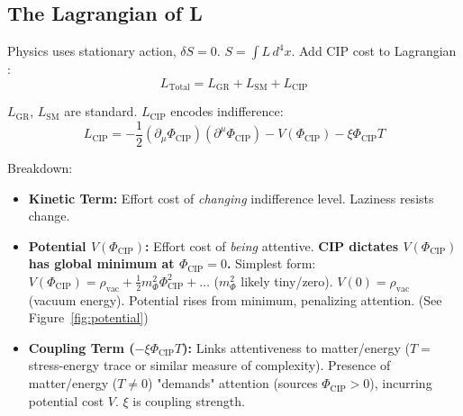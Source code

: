 \documentclass[11pt, a4paper]{article}
\newcommand{\subt}[1]{\mathrm{#1}}
\begin{document}
\subsection{The Lagrangian of L}

Physics uses stationary action, $\delta S = 0$. $S = \int L \, d^4x$. Add CIP cost to Lagrangian \cite{FeynmanQED}:
\begin{equation} \label{eq:lagrangian_total}
L_{\subt{Total}} = L_{\subt{GR}} + L_{\subt{SM}} + L_{\subt{CIP}}
\end{equation}

$L_{\subt{GR}}$, $L_{\subt{SM}}$ are standard. $L_{\subt{CIP}}$ encodes indifference:
\begin{equation} \label{eq:lagrangian_cip}
L_{\subt{CIP}} = - \frac{1}{2} (\partial_{\mu}\Phi_{\subt{CIP}})(\partial^{\mu}\Phi_{\subt{CIP}}) - V(\Phi_{\subt{CIP}}) - \xi \Phi_{\subt{CIP}} T
\end{equation}

Breakdown:
\begin{itemize}
    \item \textbf{Kinetic Term:} Effort cost of \textit{changing} indifference level. Laziness resists change.
    \item \textbf{Potential $V(\Phi_{\subt{CIP}})$:} Effort cost of \textit{being} attentive. \textbf{CIP dictates $V(\Phi_{\subt{CIP}})$ has global minimum at $\Phi_{\subt{CIP}} = 0$.} Simplest form: $V(\Phi_{\subt{CIP}}) = \rho_{\subt{vac}} + \frac{1}{2} m_{\Phi}^2 \Phi_{\subt{CIP}}^2 + \dots$ ($m_{\Phi}^2$ likely tiny/zero). $V(0) = \rho_{\subt{vac}}$ (vacuum energy). Potential rises from minimum, penalizing attention. (See Figure~\ref{fig:potential})
    \item \textbf{Coupling Term ($- \xi \Phi_{\subt{CIP}} T$):} Links attentiveness to matter/energy ($T = $ stress-energy trace or similar measure of complexity). Presence of matter/energy ($T \neq 0$) "demands" attention (sources $\Phi_{\subt{CIP}} > 0$), incurring potential cost $V$. $\xi$ is coupling strength.
\end{itemize}
\end{document}

